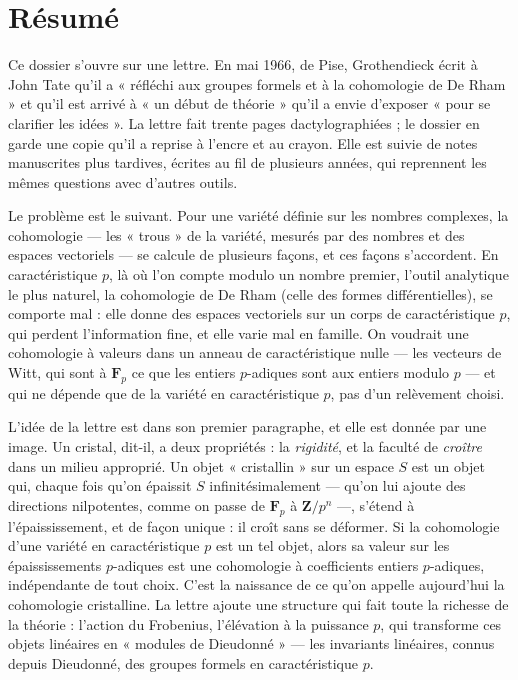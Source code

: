\documentclass[11pt,a4paper]{article}
\begin{document}
\section*{Résumé}

\begin{resume}
Ce dossier s'ouvre sur une lettre. En mai 1966, de Pise, Grothendieck écrit à
John Tate qu'il a « réfléchi aux groupes formels et à la cohomologie de De
Rham » et qu'il est arrivé à « un début de théorie » qu'il a envie d'exposer
« pour se clarifier les idées ». La lettre fait trente pages dactylographiées ;
le dossier en garde une copie qu'il a reprise à l'encre et au crayon. Elle est
suivie de notes manuscrites plus tardives, écrites au fil de plusieurs années,
qui reprennent les mêmes questions avec d'autres outils.

Le problème est le suivant. Pour une variété définie sur les nombres
complexes, la cohomologie — les « trous » de la variété, mesurés par des
nombres et des espaces vectoriels — se calcule de plusieurs façons, et ces
façons s'accordent. En caractéristique $p$, là où l'on compte modulo un nombre
premier, l'outil analytique le plus naturel, la cohomologie de De Rham (celle
des formes différentielles), se comporte mal : elle donne des espaces
vectoriels sur un corps de caractéristique $p$, qui perdent l'information
fine, et elle varie mal en famille. On voudrait une cohomologie à valeurs dans
un anneau de caractéristique nulle — les vecteurs de Witt, qui sont à $\mathbf{F}_p$
ce que les entiers $p$-adiques sont aux entiers modulo $p$ — et qui ne dépende
que de la variété en caractéristique $p$, pas d'un relèvement choisi.

L'idée de la lettre est dans son premier paragraphe, et elle est donnée par
une image. Un cristal, dit-il, a deux propriétés : la \emph{rigidité}, et la
faculté de \emph{croître} dans un milieu approprié. Un objet « cristallin » sur
un espace $S$ est un objet qui, chaque fois qu'on épaissit $S$
infinitésimalement — qu'on lui ajoute des directions nilpotentes, comme on
passe de $\mathbf{F}_p$ à $\mathbf{Z}/p^n$ —, s'étend à l'épaississement, et
de façon unique : il croît sans se déformer. Si la cohomologie d'une variété
en caractéristique $p$ est un tel objet, alors sa valeur sur les
épaississements $p$-adiques est une cohomologie à coefficients entiers
$p$-adiques, indépendante de tout choix. C'est la naissance de ce qu'on
appelle aujourd'hui la cohomologie cristalline. La lettre ajoute une structure
qui fait toute la richesse de la théorie : l'action du Frobenius, l'élévation
à la puissance $p$, qui transforme ces objets linéaires en « modules de
Dieudonné » — les invariants linéaires, connus depuis Dieudonné, des groupes
formels en caractéristique $p$.


\end{resume}
\end{document}
